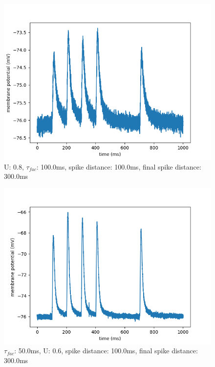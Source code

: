 \documentclass[10pt,a4paper]{scrartcl}
\begin{document}
\begin{figure} [ht]
\begin{center}
\label{fig:abb28}
\caption{U: 0.8, $\tau_{fac}$: 100.0ms, spike distance: 100.0ms, final spike distance: 300.0ms}
\includegraphics[scale=0.35]{pictures/final_spike_variation_18.pdf} 
\end{center}
\end{figure}

\newpage

\begin{figure} [ht]
\begin{center}
\label{fig:abb29}
\caption{$\tau_{fac}$: 50.0ms, U: 0.6, spike distance: 100.0ms, final spike distance: 300.0ms}
\includegraphics[scale=0.35]{pictures/final_spike_variation_19.pdf} 
\end{center}
\end{figure}
\end{document}
